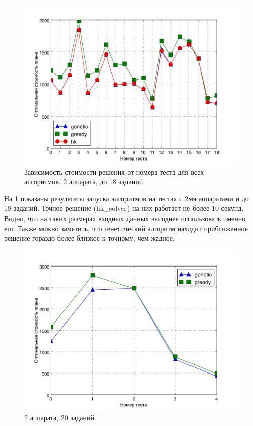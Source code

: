 \documentclass[a4paper,14pt,russian]{article}
\begin{document}
\begin{figure}[here]
\includegraphics[scale=0.6]{images/test_small1.jpg}
\caption{Зависимость стоимости решения от номера теста для всех алгоритмов. 2 аппарата, до 18 заданий.}
\label{fig:alg_small}
\end{figure}
\pagebreak

На \cref{fig:alg_small} показаны результаты запуска алгоритмов на тестах с 2мя аппаратами и до 18 заданий. Точное решение (hk\_solver) на них работает не более 10 секунд. Видно, что на таких размерах входных данных выгоднее использовать именно его. Также можно заметить, что генетический алгоритм находит приближенное решение гораздо более близкое к точному, чем жадное.

\begin{figure}[here]
\includegraphics[scale=0.6]{images/test_small2.jpg}
\caption{2 аппарата, 20 заданий.}
\label{fig:alg20}
\end{figure}
\pagebreak
\end{document}
